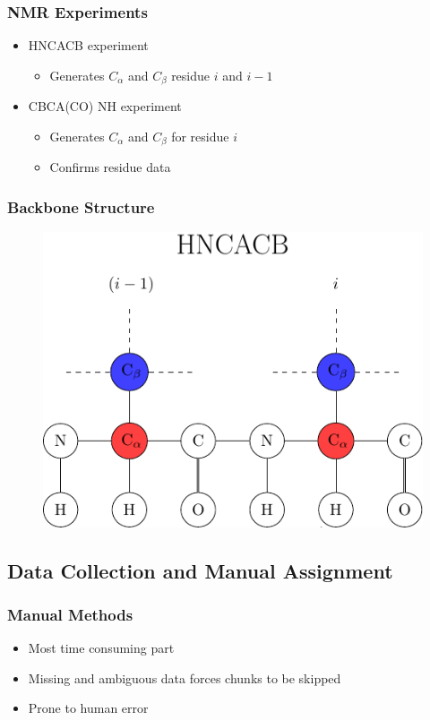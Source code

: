 \documentclass{beamer}
\begin{document}
\begin{frame}
	\frametitle{NMR Experiments}
	\begin{itemize}
		\item HNCACB experiment
		\begin{itemize}
			\item Generates $C_\alpha$ and $C_{\beta}$ residue $i$ and $i-1$
		\end{itemize}
		\vspace{12pt}
		\item CBCA(CO) NH experiment 
		\begin{itemize}
			\item Generates $C_\alpha$ and $C_{\beta}$ for residue $i$
			\item Confirms residue data
		\end{itemize}
	\end{itemize}
\end{frame}

\begin{frame}
	\frametitle{Backbone Structure}
	\begin{figure}[H]
	\begin{center}
	\includegraphics[width=.65\textwidth]{diagram}
	\end{center}
	\end{figure}
\end{frame}





\subsection{Data Collection and Manual Assignment}

\begin{frame}
	\frametitle{Manual Methods}
	\begin{itemize}
		\item Most time consuming part
		\vspace{12pt}
		\item Missing and ambiguous data forces chunks to be skipped
		\vspace{12pt}
		\item Prone to human error
	\end{itemize}

\end{frame}
\end{document}
